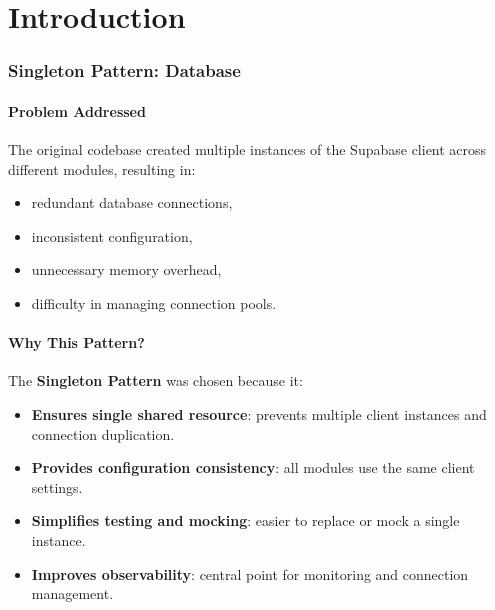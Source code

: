 \documentclass[a4paper,12pt]{report}
\begin{document}
\vspace{-1}
\chapter{Introduction}

\subsection{Singleton Pattern: Database}

\subsubsection{Problem Addressed}

The original codebase created multiple instances of the Supabase client across different modules, resulting in:

\begin{itemize}
    \item redundant database connections,
    \item inconsistent configuration,
    \item unnecessary memory overhead,
    \item difficulty in managing connection pools.
\end{itemize}

\subsubsection{Why This Pattern?}

The \textbf{Singleton Pattern} was chosen because it:
\begin{itemize}
    \item \textbf{Ensures single shared resource}: prevents multiple client instances and connection duplication.
    \item \textbf{Provides configuration consistency}: all modules use the same client settings.
    \item \textbf{Simplifies testing and mocking}: easier to replace or mock a single instance.
    \item \textbf{Improves observability}: central point for monitoring and connection management.
\end{itemize}
\end{document}
